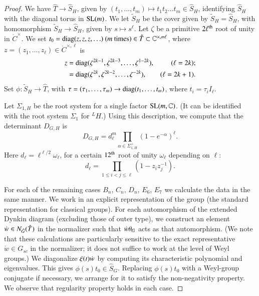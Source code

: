 \begin{proof}
We have $\hat T\to \hat S_H$, given by $(t_1,\ldots,t_m)\mapsto t_1 t_2\ldots t_m\in \hat S_H$, identifying
$\hat S_H$ with the diagonal torus in ${\operatorname{SL}}(m)$.
We let $\tilde  S_H$ be the cover given by $\tilde S_H = \hat S_H$,  with homomorphism $\tilde S_H\to \hat S_H$, given by $s\mapsto s^\ell$.
Let $\zeta$ be a primitive $2\ell^{\operatorname{th}}$ root of unity in $\ring{C}^\times$.
We set $t_0 = {\operatorname{diag}}(z,z,z,\ldots) \ (m \text{ times})\in \hat T\subset \mathbb{C}^{\times,m\ell}$, where $z=(z_1,\ldots,z_\ell)\in \ring{C}^{\times,\ell}$ is
\begin{align*}
z &= {\operatorname{diag}}(\zeta^{2k-1},\zeta^{2k-3},\ldots,\zeta^{1-2k}), &(\ell=2k);\\
      &= {\operatorname{diag}}(\zeta^{2k},\zeta^{2k-2},\ldots,\zeta^{-2k}), &(\ell=2k+1).
\end{align*}
Set
$\phi:\tilde S_H \to \hat T$, with $\tau=(\tau_1,\ldots,\tau_m)\to {\operatorname{diag}}(t_1,\ldots,t_m)$, 
where $t_i = \tau_i I_{\ell}$.

Let $\Sigma_{1,H}$ be the root system for a single factor ${\operatorname{SL}}(m,\mathbb{C})$.  (It can be identified with the  root
system $\Sigma_1$ for ${}^LH$.)
Using this description, we compute that
the determinant $D_{G,H}$ is
\[
D_{G,H} ={d_{\ell}^m} \prod_{\alpha\in\Sigma^+_{1,H}} (1-e^{-\alpha})^{\ell}.
\]
Here $d_\ell = \ell^{\ell/2} \omega_\ell$, for a certain $12^{\operatorname{th}}$ root of unity $\omega_\ell$ depending on $\ell$:
\[
d_\ell = \prod_{1\le i<j\le \ell} (1-z_i z_j^{-1}).
\]

For each of the remaining cases $B_n$, $C_n$, $D_n$, $E_6$, $E_7$ we calculate the data in
the same manner.  We work in an explicit representation of the group (the standard representation for classical groups).
For each automorphism of the extended Dynkin diagram (excluding those of outer type),
we construct an element $\dot w \in N_{\hat G}(\hat T)$ in the normalizer
such that $\dot w \theta_G$ acts as that automorphism.  
(We note that these calculations are particularly sensitive to the exact representative $\dot w\in G_{sc}$ in the normalizer; it does not
suffice to work at the level of Weyl groups.)
We diagonalize $\xi(t)\dot w $ by computing its characteristic polynomial and eigenvalues.
This gives $\phi(s) t_0\in \hat S_G$.  Replacing $\phi(s) t_0$ with a Weyl-group conjugate if necessary, we arrange for it
to satisfy the non-negativity property.  We observe that regularity property holds  in each case.


\end{proof}
